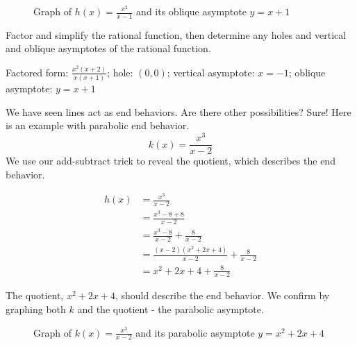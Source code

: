 \begin{figure}[htbp]
  \centering
  \caption{Graph of \( h(x) = \frac{x^2}{x - 1} \) and its oblique asymptote \( y = x + 1 \)}
\end{figure}

\begin{Exercise}[title=Rational Functions Practice 2, label=ratfunc2]
  Factor and simplify the rational function, then determine any holes and vertical and oblique asymptotes of the rational function.
  \vspace{40mm}
\end{Exercise}
\begin{Answer}[ref=ratfunc2]Factored form: $\frac{x^2(x + 2)}{x(x + 1)}$; hole: $(0, 0)$; vertical asymptote: $x = -1$; oblique asymptote: $y = x + 1$\end{Answer}

We have seen lines act as end behaviors. Are there other possibilities? Sure! Here is an example with parabolic end behavior. 
\[ k(x) = \frac{x^3}{x - 2} \]
We use our add-subtract trick to reveal the quotient, which describes the end behavior.

\begin{equation} \label{eq1}
\begin{split}
h(x) & = \frac{x^3}{x - 2} \\
& = \frac{x^3 - 8 + 8}{x - 2} \\ 
& = \frac{x^3 - 8}{x - 2} + \frac{8}{x - 2} \\
& = \frac{(x - 2)(x^2 + 2x + 4)}{x - 2} + \frac{8}{x - 2} \\
& = x^2 + 2x + 4 + \frac{8}{x - 2}
\end{split}
\end{equation}

The quotient, \( x^2 + 2x + 4 \), should describe the end behavior. We confirm by graphing both \( k \) and the quotient - the parabolic asymptote.

\begin{figure}[htbp]
  \centering
  \caption{Graph of \( k(x) = \frac{x^3}{x - 2} \) and its parabolic asymptote \( y = x^2 + 2x + 4 \)}
\end{figure}